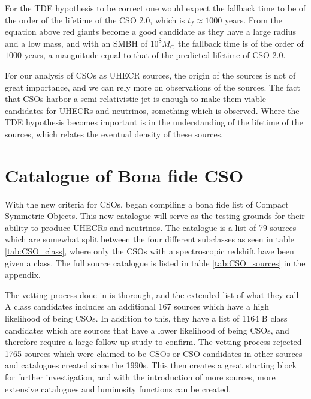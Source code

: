 For the TDE hypothesis to be correct one would expect the fallback time to be of the order of the lifetime of the CSO 2.0, which is $t_f \approx 1000$ years. From the equation above red giants become a good candidate as they have a large radius and a low mass, and with an SMBH of $10^8 M_{\odot}$ the fallback time is of the order of $1000$ years, a mangnitude equal to that of the predicted lifetime of CSO $2.0$.

For our analysis of CSOs as UHECR sources, the origin of the sources is not of great importance, and we can rely more on observations of the sources. The fact that CSOs harbor a semi relativistic jet is enough to make them viable candidates for UHECRs and neutrinos, something which is observed. Where the TDE hypothesis becomes important is in the understanding of the lifetime of the sources, which relates the eventual density of these sources.


\section{Catalogue of Bona fide CSO}
With the new criteria for CSOs, \cite{kiehlmann2023compact} began compiling a bona fide list of Compact Symmetric Objects. This new catalogue will serve as the testing grounds for their ability to produce UHECRs and neutrinos. The catalogue is a list of 79 sources which are somewhat split between the four different subclasses as seen in table \ref{tab:CSO_class}, where only the CSOs with a spectroscopic redshift have been given a class. The full source catalogue is listed in table \ref{tab:CSO_sources} in the appendix.

The vetting process done in \cite{kiehlmann2023compact} is thorough, and the extended list of what they call A class candidates includes an additional 167 sources which have a high likelihood of being CSOs. In addition to this, they have a list of 1164 B class candidates which are sources that have a lower likelihood of being CSOs, and therefore require a large follow-up study to confirm. The vetting process rejected 1765 sources which were claimed to be CSOs or CSO candidates in other sources and catalogues created since the 1990s. This then creates a great starting block for further investigation, and with the introduction of more sources, more extensive catalogues and luminosity functions can be created. 


